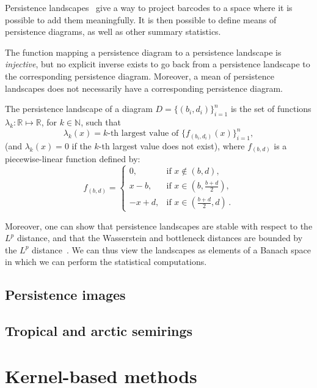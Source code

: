 \documentclass[a4paper,11pt,openany,extrafontsizes]{memoir}
\begin{document}
Persistence landscapes~\cite{bubenik_statistical_2015} give a way to
project barcodes to a space where it is possible to add them
meaningfully. It is then possible to define means of persistence
diagrams, as well as other summary statistics.

The function mapping a persistence diagram to a persistence landscape
is \emph{injective}, but no explicit inverse exists to go back from a
persistence landscape to the corresponding persistence
diagram. Moreover, a mean of persistence landscapes does not
necessarily have a corresponding persistence diagram.

\begin{defn}
  The persistence landscape of a diagram $D = \{(b_i,d_i)\}_{i=1}^n$
  is the set of functions $\lambda_k: \mathbb{R} \mapsto \mathbb{R}$,
  for $k\in\mathbb{N}$, such that
  \[ \lambda_k(x) = k\text{-th largest value of } \{f_{(b_i,
      d_i)}(x)\}_{i=1}^n, \] (and $\lambda_k(x) = 0$ if the $k$-th
  largest value does not exist), where $f_{(b,d)}$ is a
  piecewise-linear function defined by:
  \[ f_{(b,d)} =
    \begin{cases}
      0,& \text{if }x \notin (b,d),\\
      x-b,& \text{if }x\in (b,\frac{b+d}{2}),\\
      -x+d,& \text{if }x\in (\frac{b+d}{2},d)\,.
    \end{cases}
  \]
\end{defn}

Moreover, one can show that persistence landscapes are stable with
respect to the $L^p$ distance, and that the Wasserstein and bottleneck
distances are bounded by the $L^p$
distance~\cite{bubenik_statistical_2015}. We can thus view the
landscapes as elements of a Banach space in which we can perform the
statistical computations.

\subsection{Persistence images}

\cite{adams_persistence_2017}

\subsection{Tropical and arctic semirings}

\cite{kalisnik_tropical_2018}

\section{Kernel-based methods}%
\label{sec:kernel-based-methods}
\end{document}
